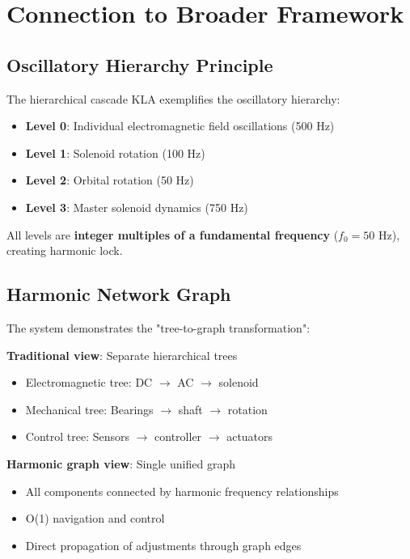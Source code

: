\documentclass[12pt,a4paper]{article}
\begin{document}
\section{Connection to Broader Framework}

\subsection{Oscillatory Hierarchy Principle}

The hierarchical cascade KLA exemplifies the oscillatory hierarchy:

\begin{itemize}
\item \textbf{Level 0}: Individual electromagnetic field oscillations (500 Hz)
\item \textbf{Level 1}: Solenoid rotation (100 Hz)
\item \textbf{Level 2}: Orbital rotation (50 Hz)
\item \textbf{Level 3}: Master solenoid dynamics (750 Hz)
\end{itemize}

All levels are \textbf{integer multiples of a fundamental frequency} ($f_0 = 50$ Hz), creating harmonic lock.

\subsection{Harmonic Network Graph}

The system demonstrates the "tree-to-graph transformation":

\textbf{Traditional view}: Separate hierarchical trees
\begin{itemize}
\item Electromagnetic tree: DC $\to$ AC $\to$ solenoid
\item Mechanical tree: Bearings $\to$ shaft $\to$ rotation
\item Control tree: Sensors $\to$ controller $\to$ actuators
\end{itemize}

\textbf{Harmonic graph view}: Single unified graph
\begin{itemize}
\item All components connected by harmonic frequency relationships
\item O(1) navigation and control
\item Direct propagation of adjustments through graph edges
\end{itemize}
\end{document}
